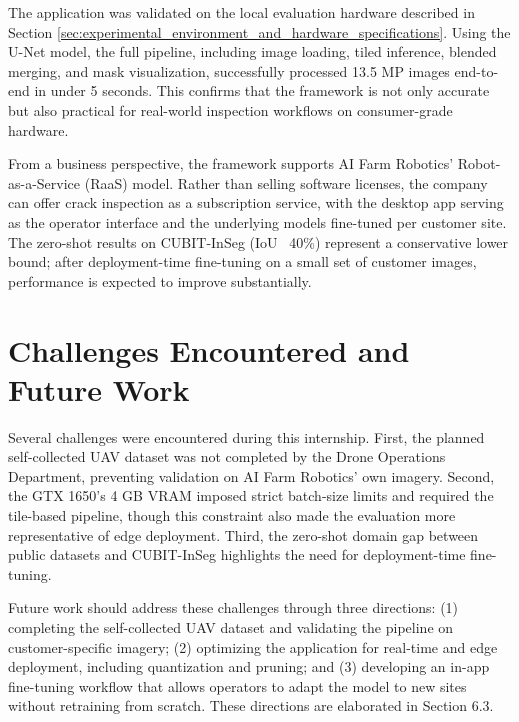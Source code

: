 \hs The application was validated on the local evaluation hardware described in Section \ref{sec:experimental_environment_and_hardware_specifications}. Using the U-Net model, the full pipeline, including image loading, tiled inference, blended merging, and mask visualization, successfully processed 13.5 MP images end-to-end in under 5 seconds. This confirms that the framework is not only accurate but also practical for real-world inspection workflows on consumer-grade hardware.

\hs From a business perspective, the framework supports AI Farm Robotics' Robot-as-a-Service (RaaS) model. Rather than selling software licenses, the company can offer crack inspection as a subscription service, with the desktop app serving as the operator interface and the underlying models fine-tuned per customer site. The zero-shot results on CUBIT-InSeg (IoU ~40\%) represent a conservative lower bound; after deployment-time fine-tuning on a small set of customer images, performance is expected to improve substantially.

\section{Challenges Encountered and Future Work}
\label{sec:challenges_and_future_work}

\hs Several challenges were encountered during this internship. First, the planned self-collected UAV dataset was not completed by the Drone Operations Department, preventing validation on AI Farm Robotics' own imagery. Second, the GTX 1650's 4 GB VRAM imposed strict batch-size limits and required the tile-based pipeline, though this constraint also made the evaluation more representative of edge deployment. Third, the zero-shot domain gap between public datasets and CUBIT-InSeg highlights the need for deployment-time fine-tuning.

\hs Future work should address these challenges through three directions: (1) completing the self-collected UAV dataset and validating the pipeline on customer-specific imagery; (2) optimizing the application for real-time and edge deployment, including quantization and pruning; and (3) developing an in-app fine-tuning workflow that allows operators to adapt the model to new sites without retraining from scratch. These directions are elaborated in Section 6.3.

